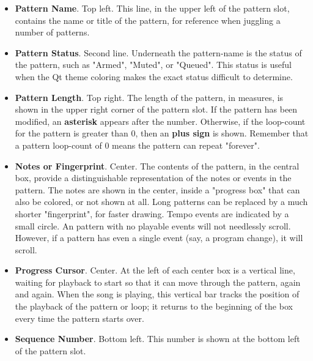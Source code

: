    \begin{itemize}
      \item \textbf{Pattern Name}. Top left.
         This line, in the upper left of the pattern slot, contains the name or
         title of the pattern, for reference when juggling a number of
         patterns.
      \item \textbf{Pattern Status}. Second line.
         Underneath the pattern-name is the status of the pattern, such as
         "Armed", "Muted", or "Queued".
         This status is useful when the Qt theme coloring makes the exact
         status difficult to determine.
      \item \textbf{Pattern Length}. Top right.
         The length of the pattern, in measures, is shown in the upper
         right corner of the pattern slot.
         If the pattern has been modified, an \textbf{asterisk}
         appears after the
         number.
         Otherwise, if the loop-count for the pattern is greater than 0, 
         then an \textbf{plus sign} is shown.
         Remember that a pattern loop-count of 0 means the pattern can repeat
         "forever".
      \item \textbf{Notes or Fingerprint}. Center.
         The contents of the pattern, in the central box,
         provide a distinguishable representation of the notes or events in the
         pattern.
         The notes are shown in the center, inside a "progress box" that
         can also be colored, or not shown at all.
         Long patterns can be replaced by a much shorter "fingerprint", for
         faster drawing.
         Tempo events are indicated by a small circle.
         An pattern with no playable events will not needlessly scroll.
         However, if a pattern has even a single event (say, a program change),
         it will scroll.
      \item \textbf{Progress Cursor}. Center.
         At the left of each center box is a vertical line, waiting for
         playback to start so that it can move through the pattern, again and
         again.
         When the song is playing, this vertical bar
         tracks the position of the playback of the pattern or loop; it
         returns to the beginning of the box every time the pattern starts
         over.
      \item \textbf{Sequence Number}. Bottom left.
         This number is shown at the bottom left of the pattern slot.

\end{itemize}
